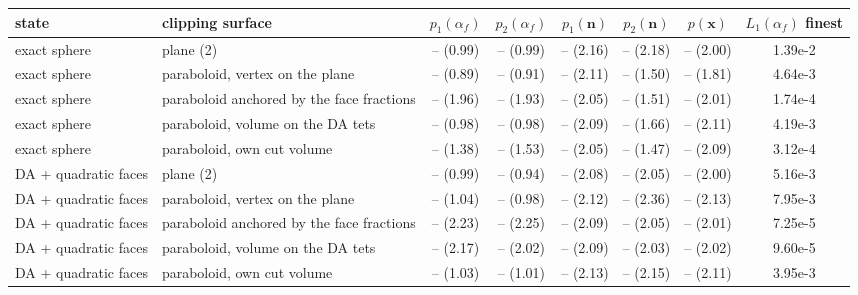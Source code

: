 \begin{tabular}{llcccccc}
\toprule
state & clipping surface & $p_1(\alpha_f)$ & $p_2(\alpha_f)$ & $p_1(\mathbf{n})$ & $p_2(\mathbf{n})$ & $p(\mathbf{x})$ & $L_1(\alpha_f)$ finest \\
\midrule
exact sphere & plane (2) & -- (0.99) & -- (0.99) & -- (2.16) & -- (2.18) & -- (2.00) & 1.39e-2 \\
exact sphere & paraboloid, vertex on the plane & -- (0.89) & -- (0.91) & -- (2.11) & -- (1.50) & -- (1.81) & 4.64e-3 \\
exact sphere & paraboloid anchored by the face fractions & -- (1.96) & -- (1.93) & -- (2.05) & -- (1.51) & -- (2.01) & 1.74e-4 \\
exact sphere & paraboloid, volume on the DA tets & -- (0.98) & -- (0.98) & -- (2.09) & -- (1.66) & -- (2.11) & 4.19e-3 \\
exact sphere & paraboloid, own cut volume & -- (1.38) & -- (1.53) & -- (2.05) & -- (1.47) & -- (2.09) & 3.12e-4 \\
DA + quadratic faces & plane (2) & -- (0.99) & -- (0.94) & -- (2.08) & -- (2.05) & -- (2.00) & 5.16e-3 \\
DA + quadratic faces & paraboloid, vertex on the plane & -- (1.04) & -- (0.98) & -- (2.12) & -- (2.36) & -- (2.13) & 7.95e-3 \\
DA + quadratic faces & paraboloid anchored by the face fractions & -- (2.23) & -- (2.25) & -- (2.09) & -- (2.05) & -- (2.01) & 7.25e-5 \\
DA + quadratic faces & paraboloid, volume on the DA tets & -- (2.17) & -- (2.02) & -- (2.09) & -- (2.03) & -- (2.02) & 9.60e-5 \\
DA + quadratic faces & paraboloid, own cut volume & -- (1.03) & -- (1.01) & -- (2.13) & -- (2.15) & -- (2.11) & 3.95e-3 \\
\bottomrule
\end{tabular}
